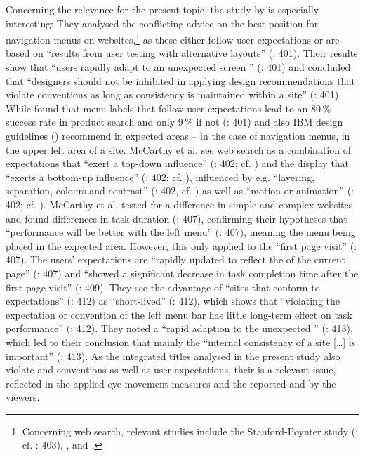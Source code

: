 Concerning the relevance for the present topic, the study by \citet{mccarthy2003} is especially interesting: They analysed the conflicting advice on the best position for navigation menus on websites,\footnote{Concerning web search, relevant studies include the Stanford-Poynter study (\citealt{Lewenstein2000}; cf. \citealt{mccarthy2003}: 403), \citet{Cowen2002}, and \citet{Goldberg2002}.} as these either follow user expectations or are based on “results from user testing with alternative layouts” (\citeyear{mccarthy2003}: 401). Their results show that “users rapidly adapt to an unexpected screen ” (\citeyear{mccarthy2003}: 401) and concluded that “designers should not be inhibited in applying design recommendations that violate  conventions as long as consistency is maintained within a site” (\citeyear{mccarthy2003}: 401). While \citet{nielsen1999} found that menu labels that follow user expectations lead to an 80\,\% success rate in product search and only 9\,\% if not (\citealt{mccarthy2003}: 401) and also IBM design guidelines (\citeyear{Ibm2003}) recommend  in expected areas – in the case of navigation menus, in the upper left area of a site. McCarthy et al. see web search as a combination of expectations that “exert a top-down influence” (\citeyear{mccarthy2003}: 402; cf. \citealt{Goldberg2002}) and the display that “exerts a bottom-up influence” (\citeyear{mccarthy2003}: 402; cf. \citealt{Goldberg2002}), influenced by e.g. “layering, separation, colours and contrast” (\citeyear{mccarthy2003}: 402, cf. \citealt{tufte1990}) as well as “motion or animation” (\citeyear{mccarthy2003}: 402; cf. \citealt{Hillstrom1994}). McCarthy et al. tested for a difference in simple and complex websites and found differences in task duration (\citeyear{mccarthy2003}: 407), confirming their hypotheses that “performance will be better with the left menu” (\citeyear{mccarthy2003}: 407), meaning the menu being placed in the expected area. However, this only applied to the “first page visit” (\citeyear{mccarthy2003}: 407). The users’ expectations are “rapidly updated to reflect the  of the current page” (\citeyear{mccarthy2003}: 407) and “showed a significant decrease in task completion time after the first page visit” (\citeyear{mccarthy2003}: 409). They see the advantage of “sites that conform to expectations” (\citeyear{mccarthy2003}: 412) as “short-lived” (\citeyear{mccarthy2003}: 412), which shows that “violating the expectation or convention of the left menu bar has little long-term effect on task performance” (\citeyear{mccarthy2003}: 412). They noted a “rapid adaption to the unexpected ” (\citeyear{mccarthy2003}: 413), which led to their conclusion that mainly the “internal consistency of a site […] is important” (\citeyear{mccarthy2003}: 413). As the integrated titles analysed in the present study also violate  and  conventions as well as user expectations, their  is a relevant issue, reflected in the applied eye movement measures and the reported  and  by the viewers.

